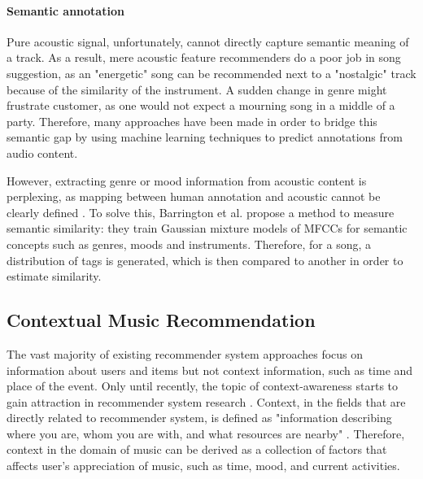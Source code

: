 \paragraph{Semantic annotation}
Pure acoustic signal, unfortunately, cannot directly capture semantic meaning of a track. As a result, mere acoustic feature recommenders do a poor job in song suggestion, as an "energetic" song can be recommended next to a "nostalgic" track because of the similarity of the instrument. A sudden change in genre might frustrate customer, as one would not expect a mourning song in a middle of a party. Therefore, many approaches have been made in order to bridge this semantic gap by using machine learning techniques to predict annotations from audio content.

However, extracting genre or mood information from acoustic content is perplexing, as mapping between human annotation and acoustic cannot be clearly defined \cite{aucouturier2009sounds}. To solve this,  Barrington et al. \cite{barrington2009smarter} propose a method to measure semantic similarity: they train Gaussian mixture models of MFCCs for semantic concepts such as genres, moods and instruments. Therefore, for a song, a distribution of tags is generated, which is then compared to another in order to estimate similarity. 

\subsection{Contextual Music Recommendation}
The vast majority of existing recommender system approaches focus on information about users and items but not context information, such as time and place of the event. Only until recently, the topic of context-awareness starts to gain attraction in recommender system research \cite{adomavicius2011context}. Context, in the fields that are directly related to recommender system, is defined as "information describing where you are, whom you are with, and what resources are nearby" \cite{schilit1994context}. Therefore, context in the domain of music can be derived as a collection of factors that affects user's appreciation of music, such as time, mood, and current activities.

